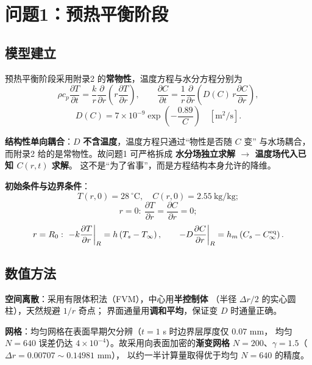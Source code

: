 \section{问题1：预热平衡阶段}

\subsection{模型建立}

预热平衡阶段采用附录2 的\textbf{常物性}，温度方程与水分方程分别为
\begin{equation}
  \rho c_p\frac{\partial T}{\partial t}
  =\frac{k}{r}\frac{\partial}{\partial r}\!\left(r\frac{\partial T}{\partial r}\right),
  \qquad
  \frac{\partial C}{\partial t}
  =\frac{1}{r}\frac{\partial}{\partial r}\!\left(D(C)\,r\frac{\partial C}{\partial r}\right),
\end{equation}
\begin{equation}
  D(C)=7\times10^{-9}\exp\!\left(-\frac{0.89}{C}\right)\quad[\mathrm{m^2/s}] .
\end{equation}

\textbf{结构性单向耦合}：$D$ \textbf{不含温度}，温度方程只通过``物性是否随 $C$ 变''
与水场耦合，而附录2 给的是常物性。故问题1 可严格拆成
\textbf{水分场独立求解 $\to$ 温度场代入已知 $C(r,t)$ 求解}。
这不是``为了省事''，而是方程结构本身允许的降维。

\textbf{初始条件与边界条件}：
\begin{equation}
  T(r,0)=28\ ^\circ\mathrm{C},\quad C(r,0)=2.55\ \mathrm{kg/kg};
\end{equation}
\begin{equation}
  r=0:\ \frac{\partial T}{\partial r}=\frac{\partial C}{\partial r}=0;
\end{equation}
\begin{equation}
  r=R_0:\ -k\frac{\partial T}{\partial r}\bigg|_{R}=h\left(T_s-T_\infty\right),
  \qquad
  -D\frac{\partial C}{\partial r}\bigg|_{R}=h_m\left(C_s-C_\infty^{\mathrm{eq}}\right).
\end{equation}

\subsection{数值方法}

\textbf{空间离散}：采用有限体积法（FVM），中心用\textbf{半控制体}
（半径 $\Delta r/2$ 的实心圆柱），天然规避 $1/r$ 奇点；
界面通量用\textbf{调和平均}，保证变 $D$ 时通量正确。

\textbf{网格}：均匀网格在表面早期欠分辨（$t=1$ s 时边界层厚度仅 $0.07$ mm，
均匀 $N=640$ 误差仍达 $4\times10^{-4}$）。故采用向表面加密的\textbf{渐变网格}
$N=200$、$\gamma=1.5$（$\Delta r=0.00707\sim0.14981$ mm），
以约一半计算量取得优于均匀 $N=640$ 的精度。

